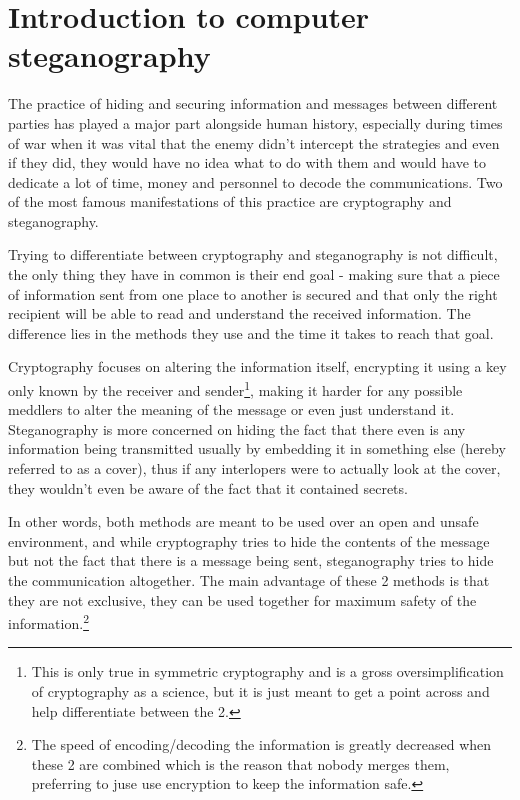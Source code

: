 
\chapter{Introduction to computer steganography}

\setlength\columnsep{20pt}
\begin{multicols*}{2}
The practice of hiding and securing information and messages between different parties has played a major part alongside human history, especially during times of war when it was vital that the enemy didn't intercept the strategies and even if they did, they would have no idea what to do with them and would have to dedicate a lot of time, money and personnel to decode the communications. Two of the most famous manifestations of this practice are cryptography and steganography\cite{steganography-history}.

Trying to differentiate between cryptography and steganography is not difficult, the only thing they have in common is their end goal - making sure that a piece of information sent from one place to another is secured and that only the right recipient will be able to read and understand the received information. The difference lies in the methods they use and the time it takes to reach that goal.

Cryptography focuses on altering the information itself, encrypting it using a key only known by the receiver and sender\footnote{This is only true in symmetric cryptography and is a gross oversimplification of cryptography as a science, but it is just meant to get a point across and help differentiate between the 2.}, making it harder for any possible meddlers to  alter the meaning of the message or even just understand it. Steganography is more concerned on hiding the fact that there even is any information being transmitted usually by embedding it in something else (hereby referred to as a cover), thus if any interlopers were to actually look at the cover, they wouldn't even be aware of the fact that it contained secrets.

In other words, both methods are meant to be used over an open and unsafe environment, and while cryptography tries to hide the contents of the message but not the fact that there is a message being sent, steganography tries to hide the communication altogether. The main advantage of these 2 methods is that they are not exclusive, they can be used together for maximum safety of the information.\footnote{The speed of encoding/decoding the information is greatly decreased when these 2 are combined which is the reason that nobody merges them, preferring to juse use encryption to keep the information safe.}


\end{multicols*}
